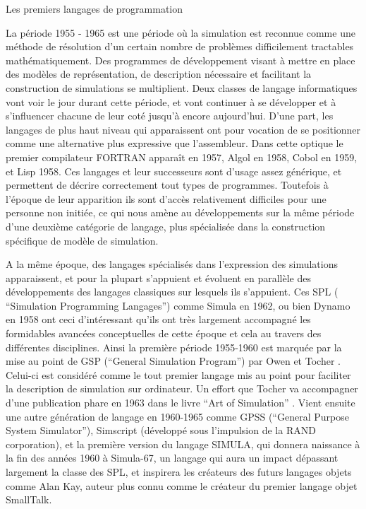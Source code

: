 \begin{framewithtitle}{ Les premiers langages de programmation }

La période 1955 - 1965 est une période où la simulation est reconnue comme une méthode de résolution d'un certain nombre de problèmes difficilement tractables mathématiquement.\autocite{Nance1993, Ackoff1961} Des programmes de développement visant à mettre en place des modèles de représentation, de description nécessaire et facilitant la construction de simulations se multiplient. Deux classes de langage informatiques vont voir le jour durant cette période, et vont continuer à se développer et à s'influencer chacune de leur coté jusqu'à encore aujourd'hui. D'une part, les langages de plus haut niveau qui apparaissent ont pour vocation de se positionner comme une alternative plus expressive que l'assembleur. Dans cette optique le premier compilateur FORTRAN apparaît en 1957,  Algol en 1958, Cobol en 1959, et Lisp 1958. Ces langages et leur successeurs sont d'usage assez générique, et permettent de décrire correctement tout types de programmes. Toutefois à l'époque de leur apparition ils sont d'accès relativement difficiles pour une personne non initiée, ce qui nous amène au développements sur la même période d'une deuxième catégorie de langage, plus spécialisée dans la construction spécifique de modèle de simulation. \autocite[239]{Naylor1966}

A la même époque, des langages spécialisés dans l'expression des simulations apparaissent, et pour la plupart s'appuient et évoluent en parallèle des développements des langages classiques sur lesquels ils s'appuient. Ces SPL ( \foreignquote{english}{Simulation Programming Langages}) comme Simula en 1962, ou bien Dynamo en 1958 ont ceci d'intéressant qu'ils ont très largement accompagné les formidables avancées conceptuelles de cette époque et cela au travers des différentes disciplines. Ainsi la première période 1955-1960 est marquée par la mise au point de GSP (\foreignquote{english}{General Simulation Program}) par Owen et Tocher \autocite{Tocher1960}. Celui-ci est considéré comme le tout premier langage mis au point pour faciliter la description de simulation sur ordinateur. Un effort que Tocher va accompagner d'une publication phare en 1963 dans le livre \foreignquote{english}{Art of Simulation} \autocite{Tocher1963} . Vient ensuite une autre génération de langage en 1960-1965 comme GPSS (\foreignquote{english}{General Purpose System Simulator}), Simscript (développé sous l'impulsion de la RAND corporation), et la première version du langage SIMULA, qui donnera naissance à la fin des années 1960 à Simula-67, un langage qui aura un impact dépassant largement la classe des SPL, et inspirera les créateurs des futurs langages objets comme Alan Kay, auteur plus connu comme le créateur du premier langage objet SmallTalk. 


\end{framewithtitle}
